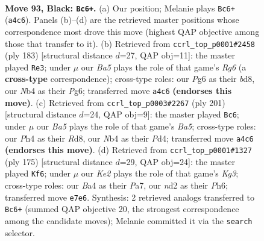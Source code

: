 \documentclass[11pt]{article}
\begin{document}
\clearpage

\begin{figure}[p]\centering
\begin{subfigure}{0.46\textwidth}\centering
\resizebox{\linewidth}{!}{%
\newchessgame
\chessboard[
  setfen={5r2/4kp2/6p1/4P3/bn3Ppp/8/3NB1KP/8 b - - 1 93},
  showmover=false,
  pgfstyle=straightmove, color=movearrow, markmove={a4-c6}
]}
\caption{}
\end{subfigure}\hfill
\begin{subfigure}{0.46\textwidth}\centering
\resizebox{\linewidth}{!}{%
\newchessgame
\chessboard[
  setfen={3B4/7p/p3B1pP/2k2p2/2Pp1P2/6r1/1K6/8 b - - 13 92},
  showmover=false,
  pgfstyle=straightmove, color=movearrow, markmove={g3-e3}
]}
\caption{}
\end{subfigure}
\\[4pt]
\begin{subfigure}{0.46\textwidth}\centering
\resizebox{\linewidth}{!}{%
\newchessgame
\chessboard[
  setfen={3r2k1/5p2/4pPpK/4P3/b2p1P2/3B4/1R6/8 b - - 26 101},
  showmover=false,
  pgfstyle=straightmove, color=movearrow, markmove={a4-c6}
]}
\caption{}
\end{subfigure}\hfill
\begin{subfigure}{0.46\textwidth}\centering
\resizebox{\linewidth}{!}{%
\newchessgame
\chessboard[
  setfen={8/p1b2p2/6kp/2p2p2/P4P2/2PBK2P/1P6/8 b - - 82 88},
  showmover=false,
  pgfstyle=straightmove, color=movearrow, markmove={g6-f6}
]}
\caption{}
\end{subfigure}
\caption{\textbf{Move 93, Black: \texttt{Bc6+}.} (a) Our position; Melanie plays \texttt{Bc6+} (\texttt{a4c6}). Panels (b)--(d) are the retrieved master positions whose correspondence most drove this move (highest QAP objective among those that transfer to it). (b) Retrieved from \texttt{ccrl\_top\_p0001\#2458} (ply 183) [structural distance $d$=27, QAP obj=11]: the master played \texttt{Re3}; under $\mu$ our \emph{Ba5} plays the role of that game's \emph{Rg6} (a \textbf{cross-type} correspondence); cross-type roles: our \emph{P}g6 as their \emph{b}d8, our \emph{N}b4 as their \emph{P}g6; transferred move \texttt{a4c6} \textbf{(endorses this move)}. (c) Retrieved from \texttt{ccrl\_top\_p0003\#2267} (ply 201) [structural distance $d$=24, QAP obj=9]: the master played \texttt{Bc6}; under $\mu$ our \emph{Ba5} plays the role of that game's \emph{Ba5}; cross-type roles: our \emph{P}h4 as their \emph{R}d8, our \emph{N}b4 as their \emph{P}d4; transferred move \texttt{a4c6} \textbf{(endorses this move)}. (d) Retrieved from \texttt{ccrl\_top\_p0001\#1327} (ply 175) [structural distance $d$=29, QAP obj=24]: the master played \texttt{Kf6}; under $\mu$ our \emph{Ke2} plays the role of that game's \emph{Kg3}; cross-type roles: our \emph{B}a4 as their \emph{P}a7, our \emph{n}d2 as their \emph{P}h6; transferred move \texttt{e7e6}. Synthesis: 2 retrieved analogs transferred to \texttt{Bc6+} (summed QAP objective 20, the strongest correspondence among the candidate moves); Melanie committed it via the \texttt{search} selector.}
\label{fig:thought-m185}
\end{figure}
\end{document}
